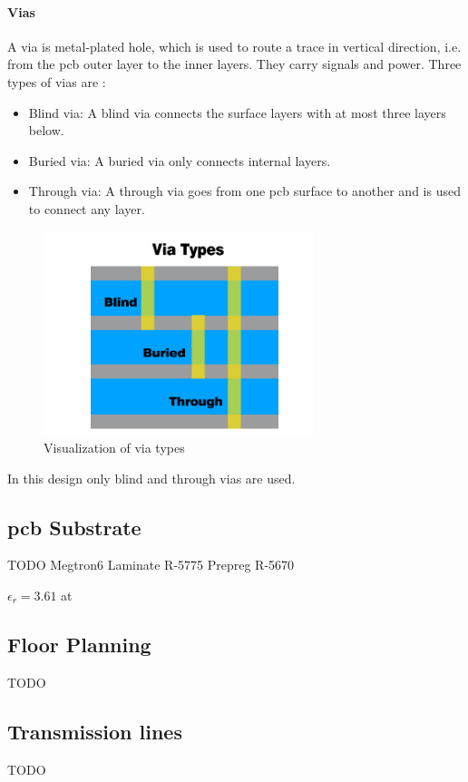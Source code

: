 \paragraph{Vias}
A via is metal-plated hole, which is used to route a trace in vertical direction, i.e. from the \gls{pcb} outer layer to the inner layers. They carry signals and power. Three types of vias are \cite{vias}:
\begin{itemize}
	\item Blind via: A blind via connects the surface layers with at most three layers below.
	\item Buried via: A buried via only connects internal layers.
	\item Through via: A through via goes from one \gls{pcb} surface to another and is used to connect any layer. 
\end{itemize}
\begin{figure}[tbh]
	\centering
	\includegraphics[width = 0.7\textwidth]{chap/04-work/img/vias}
	\caption[Via types]{Visualization of via types \cite{vias}}
	\label{fig:vias}
\end{figure}

In this design only blind and through vias are used.

\subsection{\gls{pcb} Substrate}
TODO
Megtron6 Laminate R-5775 Prepreg R-5670

$\epsilon_r = 3.61$ at 
\subsection{Floor Planning}
TODO
\subsection{Transmission lines}
TODO 

